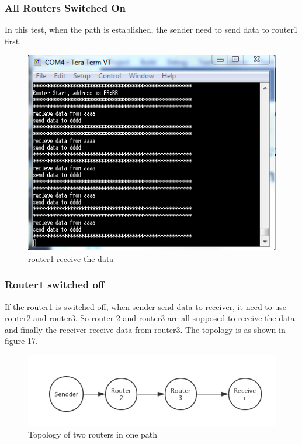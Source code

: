 \documentclass[a4paper]{article}
\begin{document}
\subsubsection{All Routers Switched On}

In this test, when the path is established, the sender need to send data to router1 first.

\begin{figure}[!htb]
   \centering
   \includegraphics[scale=0.8]{test8}
	\begin{center}
	   \caption{router1 receive the data}
	\end{center}	   
    \label{fig:test8}
\end{figure}

\subsubsection{Router1 switched off}

If the router1 is switched off, when sender send data to receiver, it need to use router2 and router3. So router 2 and router3 are all supposed to receive the data and finally the receiver receive data from router3. The topology is as shown in figure 17.

\begin{figure}[!htb]
   \centering
   \includegraphics[scale=0.8]{chart4}
	\begin{center}
	   \caption{Topology of two routers in one path}
	\end{center}	   
    \label{fig:chart4}
\end{figure}
\end{document}
